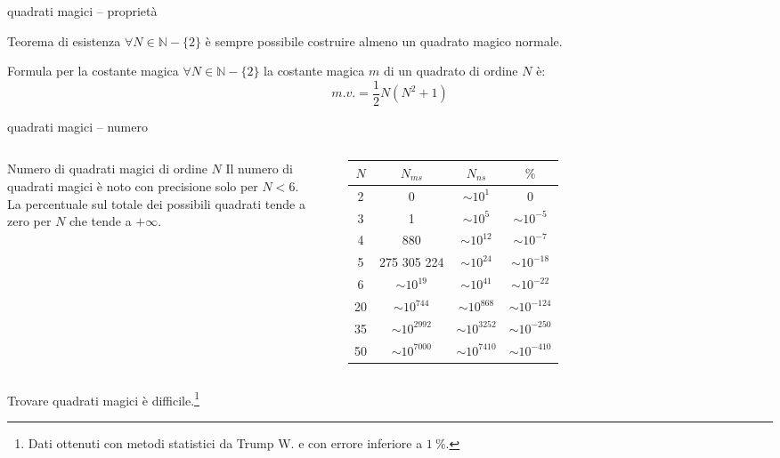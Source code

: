\documentclass[10pt]{beamer}
\begin{document}
\begin{frame}{quadrati magici -- proprietà}
	\begin{alertblock}{Teorema di esistenza}
		$ \forall N \in \mathbb{N} - \{2\} $ è sempre possibile costruire almeno un quadrato magico normale.
	\end{alertblock}

	\begin{alertblock}{Formula per la costante magica}
		$ \forall N \in \mathbb{N} - \{2\} $ la costante magica $ \mathit{m} $ di un quadrato di ordine $ N $ è:
		\begin{equation*}\label{equa:costante_magica}
		 \mathit{m.v.} = \frac{1}{2} N (N^2 + 1)
		\end{equation*}
	\end{alertblock}
\end{frame}


\begin{frame}{quadrati magici -- numero}
	\begin{columns}

	\begin{block}{Numero di quadrati magici di ordine $ N $}
		Il numero di quadrati magici è noto con precisione solo per $ N<6 $. \\
		La percentuale sul totale dei possibili quadrati tende a zero per $ N $ che tende a $ +\infty $.
	\end{block}

		\begin{tabular}{cccc} \toprule
			$ N $ &       $ N_{ms} $        &       $ N_{ns} $        &  $ \si{\percent} $   \\ \midrule
			2   &            0            &    $ \sim  10^{1} $     &          0           \\
			3   &            1            &     $ \sim 10^{5} $     &   $ \sim 10^{-5} $   \\
			4   &           880           &    $ \sim 10^{12} $     &   $ \sim 10^{-7} $   \\
			5   &       275 305 224       &    $ \sim 10^{24} $     &  $ \sim 10^{-18} $   \\
			6   &    $ \sim 10^{19} $     &    $ \sim 10^{41} $     &  $ \sim 10^{-22} $   \\
			20   &    $ \sim 10^{744} $    &    $ \sim 10^{868} $    &  $ \sim 10^{-124} $  \\
			35   &   $ \sim 10^{2992} $    &   $ \sim 10^{3252} $    &  $ \sim 10^{-250} $  \\
			50   &   $ \sim 10^{7000} $    &   $ \sim 10^{7410} $    &  $ \sim 10^{-410} $\\ \bottomrule
		\end{tabular}
	\end{columns}
	\centering
	Trovare quadrati magici è \alert{difficile}.\footnote{Dati ottenuti con metodi statistici da Trump W. e con errore inferiore a $ \SI{1}{\percent} $.}
\end{frame}
\end{document}
